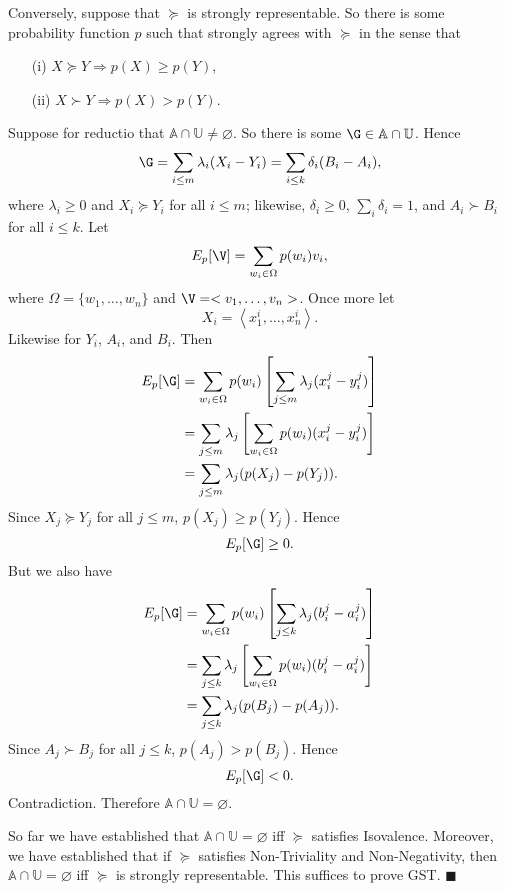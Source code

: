 Conversely, suppose that $\succeq$ is strongly representable. So there is some probability function $p$ such that strongly agrees with $\succeq$ in the sense that
\begin{enumerate}
\item[(i)] $X\succeq Y \Rightarrow p(X)\geq p(Y)$,
\item[(ii)] $X\succ Y \Rightarrow p(X)>p(Y)$.
\end{enumerate}
Suppose for reductio that $\mathbb{A}\cap\mathbb{U}\not=\varnothing$. So there is some $\G\in\mathbb{A}\cap\mathbb{U}$. Hence
$$ \G=\sum_{i\leq m} \lambda_i(X_i-Y_i)=\sum_{i\leq k} \delta_i(B_i-A_i), $$
where $\lambda_i\geq0$ and $X_i\succeq Y_i$ for all $i\leq m$; likewise, $\delta_i\geq0$, $\sum_i\delta_i=1$, and $A_i\succ B_i$ for all $i\leq k$.
Let 
$$ E_p[\V]=\sum_{w_i\in\Omega} p(w_i)v_i, $$
where $\Omega=\{w_1,\hdots,w_n\}$ and $\V=<v_1,\hdots,v_n>$. Once more let 
$$ X_i=\left<x^i_1,\hdots,x^i_n\right>. $$
Likewise for $Y_i$, $A_i$, and $B_i$. Then
$$
\begin{aligned}
E_p[\G]&=\displaystyle\sum_{w_i\in\Omega} p(w_i) \left[\sum_{j\leq m} \lambda_j(x^j_i-y^j_i)\right]\\
       &=\displaystyle\sum_{j\leq m} \lambda_j \left[\sum_{w_i\in\Omega} p(w_i)(x^j_i-y^j_i)\right]\\
			 &=\displaystyle\sum_{j\leq m} \lambda_j (p(X_j)-p(Y_j)).
\end{aligned}
$$
Since $X_j\succeq Y_j$ for all $j\leq m$, $p(X_j)\geq p(Y_j)$. Hence 
$$ E_p[\G]\geq0. $$
But we also have
$$
\begin{aligned}
E_p[\G]&=\displaystyle\sum_{w_i\in\Omega} p(w_i) \left[\sum_{j\leq k} \lambda_j(b^j_i-a^j_i)\right]\\
       &=\displaystyle\sum_{j\leq k} \lambda_j \left[\sum_{w_i\in\Omega} p(w_i)(b^j_i-a^j_i)\right]\\
			 &=\displaystyle\sum_{j\leq k} \lambda_j (p(B_j)-p(A_j)).
\end{aligned}
$$
Since $A_j\succ B_j$ for all $j\leq k$, $p(A_j)> p(B_j)$. Hence 
$$ E_p[\G]<0. $$
Contradiction. Therefore $\mathbb{A}\cap\mathbb{U}=\varnothing$.

So far we have established that $\mathbb{A}\cap\mathbb{U}=\varnothing$ iff $\succeq$ satisfies Isovalence. Moreover, we have established that if $\succeq$ satisfies Non-Triviality and Non-Negativity, then $\mathbb{A}\cap\mathbb{U}=\varnothing$ iff $\succeq$ is strongly representable. This suffices to prove GST. \hfill$\blacksquare$

